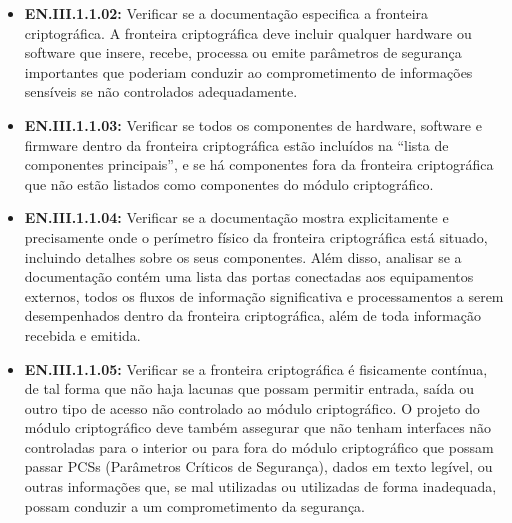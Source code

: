 \documentclass[12pt, a4paper]{article}
\begin{document}
\begin{itemize}[leftmargin=*, nosep]
\begin{itemize}
            \item Encapsulamentos/revestimentos, incluindo quaisquer portas de acesso removíveis ou coberturas/camadas;
            \item Conectores físicos para dispositivos externos ao módulo criptográfico, ou entre quaisquer submódulos independentes do módulo principal;
            \item Módulos de software/firmware que são modificáveis;
            \item Módulos de software/firmware que não são modificáveis;
            \item Outros tipos de componentes que não estão listados acima.
        \end{itemize}
        \item \textbf{EN.III.1.1.02:} Verificar se a documentação especifica a fronteira criptográfica. A fronteira criptográfica deve incluir qualquer hardware ou software que insere, recebe, processa ou emite parâmetros de segurança importantes que poderiam conduzir ao comprometimento de informações sensíveis se não controlados adequadamente.
        \item \textbf{EN.III.1.1.03:} Verificar se todos os componentes de hardware, software e firmware dentro da fronteira criptográfica estão incluídos na “lista de componentes principais”, e se há componentes fora da fronteira criptográfica que não estão listados como componentes do módulo criptográfico.
        \item \textbf{EN.III.1.1.04:} Verificar se a documentação mostra explicitamente e precisamente onde o perímetro físico da fronteira criptográfica está situado, incluindo detalhes sobre os seus componentes. Além disso, analisar se a documentação contém uma lista das portas conectadas aos equipamentos externos, todos os fluxos de informação significativa e processamentos a serem desempenhados dentro da fronteira criptográfica, além de toda informação recebida e emitida.
        \item \textbf{EN.III.1.1.05:} Verificar se a fronteira criptográfica é fisicamente contínua, de tal forma que não haja lacunas que possam permitir entrada, saída ou outro tipo de acesso não controlado ao módulo criptográfico. O projeto do módulo criptográfico deve também assegurar que não tenham interfaces não controladas para o interior ou para fora do módulo criptográfico que possam passar PCSs (Parâmetros Críticos de Segurança), dados em texto legível, ou outras informações que, se mal utilizadas ou utilizadas de forma inadequada, possam conduzir a um comprometimento da segurança.

\end{itemize}
\end{document}
